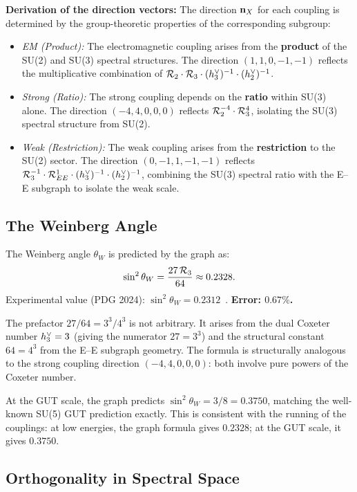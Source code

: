 \textbf{Derivation of the direction vectors:} The direction $\mathbf{n}_X$ for each coupling is determined by the group-theoretic properties of the corresponding subgroup:
\begin{itemize}
\item \textit{EM (Product):} The electromagnetic coupling arises from the \textbf{product} of the SU(2) and SU(3) spectral structures. The direction $(1, 1, 0, -1, -1)$ reflects the multiplicative combination of $\mathcal{R}_2 \cdot \mathcal{R}_3 \cdot (h^\vee_3)^{-1} \cdot (h^\vee_2)^{-1}$.
\item \textit{Strong (Ratio):} The strong coupling depends on the \textbf{ratio} within SU(3) alone. The direction $(-4, 4, 0, 0, 0)$ reflects $\mathcal{R}_2^{-4} \cdot \mathcal{R}_3^4$, isolating the SU(3) spectral structure from SU(2).
\item \textit{Weak (Restriction):} The weak coupling arises from the \textbf{restriction} to the SU(2) sector. The direction $(0, -1, 1, -1, -1)$ reflects $\mathcal{R}_3^{-1} \cdot \mathcal{R}_{EE}^1 \cdot (h^\vee_3)^{-1} \cdot (h^\vee_2)^{-1}$, combining the SU(3) spectral ratio with the E--E subgraph to isolate the weak scale.
\end{itemize}

\subsection{The Weinberg Angle}\label{sec:weinberg_angle}

The Weinberg angle $\theta_W$ is predicted by the graph as:
\begin{equation}
\sin^2\theta_W = \frac{27\,\mathcal{R}_3}{64} \approx 0.2328.
\end{equation}
Experimental value (PDG 2024): $\sin^2\theta_W = 0.2312$~\cite{pdg2024}. \textbf{Error: $0.67\%$.}

The prefactor $27/64 = 3^3 / 4^3$ is not arbitrary. It arises from the dual Coxeter number $h^\vee_3 = 3$ (giving the numerator $27 = 3^3$) and the structural constant $64 = 4^3$ from the E--E subgraph geometry. The formula is structurally analogous to the strong coupling direction $(-4, 4, 0, 0, 0)$: both involve pure powers of the Coxeter number.

At the GUT scale, the graph predicts $\sin^2\theta_W = 3/8 = 0.3750$, matching the well-known SU(5) GUT prediction exactly. This is consistent with the running of the couplings: at low energies, the graph formula gives $0.2328$; at the GUT scale, it gives $0.3750$.

\subsection{Orthogonality in Spectral Space}\label{sec:orthogonality}

